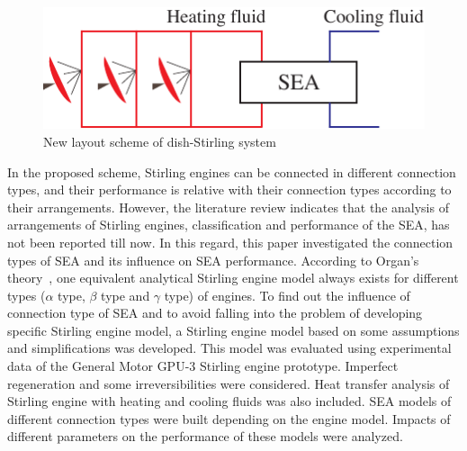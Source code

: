 \documentclass[review,3p,10t]{elsarticle}
\begin{document}
\noindent \begin{figure}[htbp]
\begin{center}
	\includegraphics[width = 0.7\columnwidth]{./graphics/Dish_SEA.pdf}
	\caption{New layout scheme of dish-Stirling system}
	\label{fig:Dish_SEA}
\end{center}
\end{figure}

In the proposed scheme, Stirling engines can be connected in different connection types, and their performance is relative with their connection types according to their arrangements. However, the literature review indicates that the analysis of arrangements of Stirling engines, classification and performance of the SEA, has not been reported till now. In this regard, this paper investigated the connection types of SEA and its influence on SEA performance. According to Organ's theory~\cite{Organ1997}, one equivalent analytical Stirling engine model always exists for different types ($\alpha$ type, $\beta$ type and $\gamma$ type) of engines. To find out the influence of connection type of SEA and to avoid falling into the problem of developing specific Stirling engine model, a Stirling engine model based on some assumptions and simplifications was developed. This model was evaluated using experimental data of the General Motor GPU-3 Stirling engine prototype. Imperfect regeneration and some irreversibilities were considered. Heat transfer analysis of Stirling engine with heating and cooling fluids was also included. SEA models of different connection types were built depending on the engine model. Impacts of different parameters on the performance of these models were analyzed.
\end{document}

